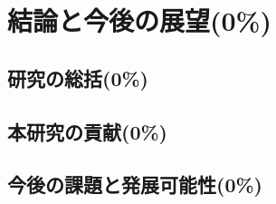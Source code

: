 \section{結論と今後の展望(0\%)}
  \label{sec:結論と今後の展望}
    \par
  
  \subsection{研究の総括(0\%)}
    \label{sec:研究の総括}
      \par
      
  \subsection{本研究の貢献(0\%)}
    \label{sec:本研究の貢献}
      \par
      
  \subsection{今後の課題と発展可能性(0\%)}
    \label{sec:今後の課題と発展可能性}
      \par
